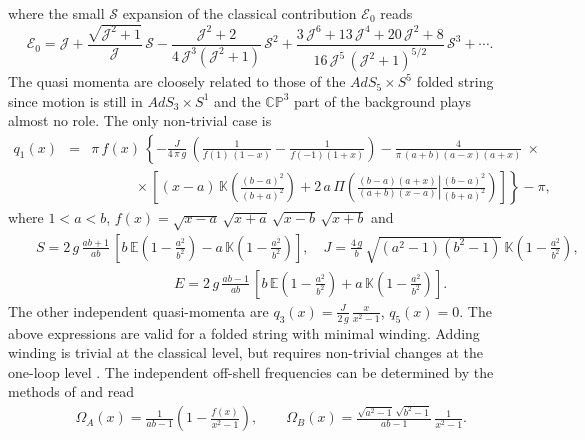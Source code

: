 where the small $\mathcal S$ expansion of the classical contribution $\mathcal E_{0}$ reads
\begin{equation}
\label{eq:classical}
 \mathcal E_{0}= \mathcal J+\frac{\sqrt{\mathcal J^{2}+1}}{\mathcal J}\,\mathcal S-\frac{\mathcal J^{2}+2}{4\,\mathcal J^{3}(\mathcal J^{2}+1)}\,\mathcal S^{2}+ 
 \frac{3\,\mathcal J^{6}+13\,\mathcal J^{4}+20\,\mathcal J^{2}+8}{16\,\mathcal J^{5}\,(\mathcal J^{2}+1)^{5/2}}\,\mathcal S^{3}+\cdots.
\end{equation}
The quasi momenta are cloosely related to those of the $AdS_5 \times S^5$ folded string since motion is still in $AdS_{3}\times S^{1}$
and the $\mathbb{CP}^{3}$ part of the background plays almost no role. The only non-trivial case is 
\begin{eqnarray}
q_{1}(x) &=& \pi\,f(x)\,\left\{-\frac{J}{4\,\pi\,g}\,\left(\frac{1}{f(1)\,(1-x)}-\frac{1}{f(-1)(1+x)}\right) 
-\frac{4}{\pi\,(a+b)(a-x)(a+x)}\ \times \right. \nonumber \\
&& \left.\qquad \ \ \ \ \  \times \left[
(x-a)\,\mathbb K\left(\frac{(b-a)^{2}}{(b+a)^{2}}\right)
+ 2\,a\,\Pi\left(\left.
\frac{(b-a)(a+x)}{(a+b)(x-a)} \right| \frac{(b-a)^{2}}{(b+a)^{2}}
\right)
\right]
\right\}-\pi,
\end{eqnarray}
where $1<a<b$, $f(x) = \sqrt{x-a}\,\sqrt{x+a}\,\sqrt{x-b}\,\sqrt{x+b}$ and
\begin{eqnarray}
&& S = 2\,g\,\frac{ab+1}{ab}\,\left[b\,\mathbb E\left(1-\frac{a^{2}}{b^{2}}\right)
-a\,\mathbb K\left(1-\frac{a^{2}}{b^{2}}\right)\right], 
\quad \nonumber 
J = \frac{4\,g}{b}\,\sqrt{(a^{2}-1)(b^{2}-1)}\,\mathbb K\left(1-\frac{a^{2}}{b^{2}}\right), \\
&&\phantom{MBnmnpfdmdqctpdm} E = 2\,g\,\frac{ab-1}{ab}\,\left[b\,\mathbb E\left(1-\frac{a^{2}}{b^{2}}\right)
+a\,\mathbb K\left(1-\frac{a^{2}}{b^{2}}\right)\right].
\end{eqnarray}
The other independent quasi-momenta are $q_{3}(x) = \frac{J}{2\,g}\,\frac{x}{x^{2}-1}$, $q_{5}(x) = 0$. The above expressions are valid for a folded string with minimal winding. Adding winding is trivial at the classical level, but requires non-trivial changes at the one-loop level \cite{Gromov:2011bz}. The independent off-shell frequencies can be determined by the methods of \cite{Gromov:2008ec} and read
\begin{eqnarray}
&& \Omega_{A}(x) =  \frac{1}{ab-1}\left(1-\frac{f(x)}{x^{2}-1}\right),   \qquad \Omega_{B}(x) = \frac{\sqrt{a^{2}-1}\,\sqrt{b^{2}-1}}{ab-1}\,\frac{1}{x^{2}-1}.
\end{eqnarray}
